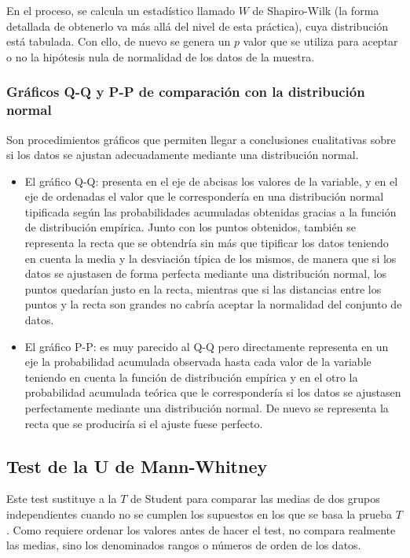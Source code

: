 En el proceso, se calcula un estadístico llamado $W$ de Shapiro-Wilk (la forma detallada de obtenerlo va más allá del nivel de esta
práctica), cuya distribución está tabulada. Con ello, de nuevo se genera un $p$ valor que se utiliza para aceptar o no la hipótesis nula de
normalidad de los datos de la muestra.

\subsubsection{Gráficos Q-Q y P-P de comparación con la distribución normal}
Son procedimientos gráficos que permiten llegar a conclusiones cualitativas sobre si los datos se ajustan adecuadamente mediante una
distribución normal.
\begin{itemize}
\item El gráfico Q-Q: presenta en el eje de abcisas los valores de la variable, y en el eje de ordenadas el valor que le correspondería en
una distribución normal tipificada según las probabilidades acumuladas obtenidas gracias a la función de distribución empírica. Junto con
los puntos obtenidos, también se representa la recta que se obtendría sin más que tipificar los datos teniendo en cuenta la media y la
desviación típica de los mismos, de manera que si los datos se ajustasen de forma perfecta mediante una distribución normal, los puntos
quedarían justo en la recta, mientras que si las distancias entre los puntos y la recta son grandes no cabría aceptar la normalidad del
conjunto de datos.

\item El gráfico P-P: es muy parecido al Q-Q pero directamente representa en un eje la probabilidad acumulada observada hasta cada valor de
la variable teniendo en cuenta la función de distribución empírica y en el otro la probabilidad acumulada teórica que le correspondería si
los datos se ajustasen perfectamente mediante una distribución normal. De nuevo se representa la recta que se produciría si el ajuste fuese
perfecto.
\end{itemize}

\subsection{Test de la U de Mann-Whitney}
Este test sustituye a la $T$ de Student para comparar las medias de dos grupos independientes cuando no se cumplen los supuestos en los que
se basa la prueba $T$. Como requiere ordenar los valores antes de hacer el test, no compara realmente las medias, sino los denominados
rangos o números de orden de los datos.

